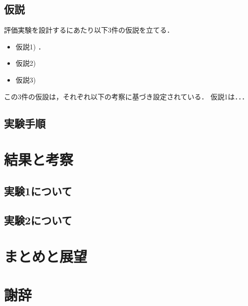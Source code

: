 \documentclass[12pt,a4j]{jreport}
\begin{document}
\section{仮説}
評価実験を設計するにあたり以下3件の仮説を立てる．
\begin{itemize}
  \item 仮説1) ．
  \item 仮説2) 
  \item 仮説3) 
\end{itemize}
この3件の仮設は，それぞれ以下の考察に基づき設定されている．
仮説1は．．．


\section{実験手順}




\chapter{結果と考察}


\section{実験1について}


\section{実験2について}





\chapter{まとめと展望}





\chapter*{謝辞}



\end{document}
